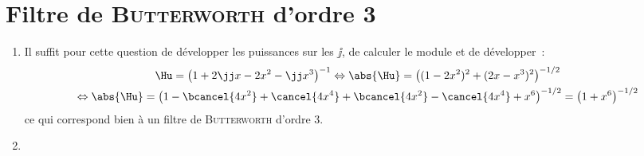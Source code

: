 \documentclass[a4paper, 12pt, final, garamond]{book}
\begin{document}
\section{Filtre de \textsc{Butterworth} d'ordre 3}
\begin{enumerate}
    \item Il suffit pour cette question de développer les puissances sur les
        $\jj$, de calculer le module et de développer~:
        \begin{gather*}
            \Hu = \left( 1 + 2\jj x - 2x^2 -\jj x^3 \right)^{-1}
            \Leftrightarrow
            \abs{\Hu}
                = \left( (1-2x^2)^2 + (2x - x^3)^2 \right)^{-1/2}\\
            \Leftrightarrow
            \abs{\Hu}
                = \left( 1-\bcancel{4x^2} + \cancel{4x^4}
                    + \bcancel{4x^2} - \cancel{4x^4} + x^6 \right)^{-1/2}
                = \left( 1+x^6 \right)^{-1/2}
        \end{gather*}
        ce qui correspond bien à un filtre de \textsc{Butterworth} d'ordre 3.
    \item ~


\end{enumerate}
\end{document}
